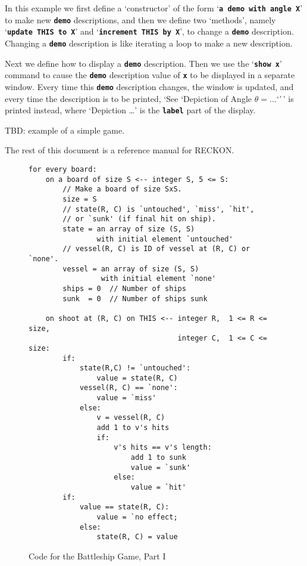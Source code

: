 \documentclass[12pt]{article}
\newcommand{\TT}[1]{{\tt \bfseries #1}}
\newlength{\figurewidth}
\newenvironment{boxedfigure}[1][!btp]%
	{\begin{figure*}[#1]
	 \begin{lrbox}{\figurebox}
	 \begin{minipage}{\figurewidth}

	 \vspace*{1ex}}%
	{
	 \vspace*{1ex}

	 \end{minipage}
	 \end{lrbox}
	 \begin{center}
	 \fbox{\hspace*{0.1in}\usebox{\figurebox}\hspace*{0.1in}}
	 \end{center}
	 \end{figure*}}
\begin{document}
In this example we first define a `constructor'
of the form `\TT{a demo with angle X}' to make new \TT{demo} descriptions,
and then we define two `methods', namely `\TT{update THIS to X}' and
`\TT{in\-cre\-ment THIS by X}', to change a \TT{demo} description.  Changing
a \TT{demo} description is like iterating a loop to make a new description.

Next we define how to display a \TT{demo} description.  Then we use the
`\TT{show x}' command
to cause the \TT{demo} description value of \TT{x}
to be displayed in a separate window.
Every time this \TT{demo} description
changes, the window is updated, and every time the description
is to be printed,
`See `Depiction of Angle $\theta=\ldots^\circ$'\,'
is printed instead, where `Depiction \ldots' is the \TT{label} part of
the display.


TBD: example of a simple game.

The rest of this document is a reference manual for RECKON.

\begin{boxedfigure}

\small

\begin{verbatim}
for every board:
    on a board of size S <-- integer S, 5 <= S:
        // Make a board of size SxS.
        size = S
        // state(R, C) is `untouched', `miss', `hit',
        // or `sunk' (if final hit on ship).
        state = an array of size (S, S)
                with initial element `untouched'
        // vessel(R, C) is ID of vessel at (R, C) or `none'.
        vessel = an array of size (S, S)
                 with initial element `none'
        ships = 0  // Number of ships
        sunk  = 0  // Number of ships sunk

    on shoot at (R, C) on THIS <-- integer R,  1 <= R <= size,
                                   integer C,  1 <= C <= size:
        if:
            state(R,C) != `untouched':
                value = state(R, C)
            vessel(R, C) == `none':
                value = `miss'
            else:
                v = vessel(R, C)
                add 1 to v's hits
                if:
                    v's hits == v's length:
                        add 1 to sunk
                        value = `sunk'
                    else:
                        value = `hit'
        if:
            value == state(R, C):
                value = `no effect;
            else:
                state(R, C) = value
\end{verbatim}\vspace{-4ex}

\caption{Code for the Battleship Game, Part I}
\label{CODE-FOR-BATTLESHIP-1}
\end{boxedfigure}
\end{document}
